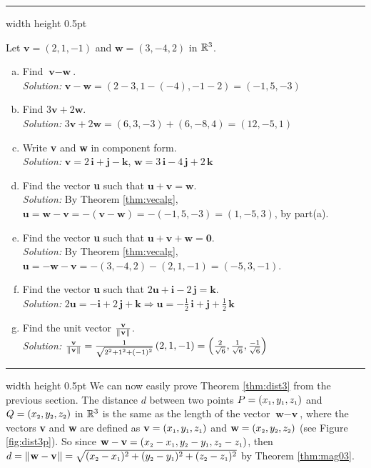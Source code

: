 \hrule width \textwidth height 0.5pt
\begin{exmp}
 Let $\textbf{v} = (2,1,-1)$ and $\textbf{w} = (3,-4,2)$ in $\mathbb{R}^{3}$.
 \begin{enumerate}[(a)]
  \item Find $\textbf{v} - \textbf{w}$.\\\emph{Solution:} $\textbf{v} - \textbf{w} =
   (2 - 3,1 - (-4), -1 - 2) = (-1,5,-3)$
  \item Find $3\textbf{v} + 2\textbf{w}$.\\\emph{Solution:} $3\textbf{v} + 2\textbf{w} = (6,3,-3) + (6,-8,4) =
   (12,-5,1)$
  \item Write \textbf{v} and \textbf{w} in component form.\\\emph{Solution:}
   $\textbf{v} = 2\,\textbf{i} + \textbf{j} - \textbf{k}$, $\textbf{w} = 3\,\textbf{i} - 4\,\textbf{j} + 2\,\textbf{k}$
  \item Find the vector \textbf{u} such that $\textbf{u} + \textbf{v} = \textbf{w}$.\\\emph{Solution:} By Theorem
   \ref{thm:vecalg}, $\textbf{u} = \textbf{w} - \textbf{v} = -(\textbf{v} - \textbf{w}) = -(-1,5,-3) = (1,-5,3)$, by
   part(a).
  \item Find the vector \textbf{u} such that $\textbf{u} + \textbf{v} + \textbf{w} = \textbf{0}$.\\\emph{Solution:}
   By Theorem \ref{thm:vecalg}, $\textbf{u} = -\textbf{w} - \textbf{v} = -(3,-4,2) - (2,1,-1) = (-5,3,-1)$.
  \item Find the vector \textbf{u} such that $2\textbf{u} + \textbf{i} - 2\,\textbf{j} = \textbf{k}$.\\\emph{Solution:}
   $2\textbf{u} = -\textbf{i} + 2\,\textbf{j} + \textbf{k} \Longrightarrow \textbf{u} = -\frac{1}{2}\,\textbf{i} +
  \textbf{j} + \frac{1}{2}\,\textbf{k}$
  \item Find the unit vector $\frac{\textbf{v}}{\lVert\mspace{1mu}\textbf{v}\mspace{1mu}\rVert}$.\\\emph{Solution:}
   $\frac{\textbf{v}}{\lVert\mspace{1mu}\textbf{v}\mspace{1mu}\rVert} = \frac{1}{\sqrt{2^2 + 1^2 + (-1)^2}} \,(2,1,-1) =
   \left ( \frac{2}{\sqrt{6}},\frac{1}{\sqrt{6}},\frac{-1}{\sqrt{6}} \right )$
 \end{enumerate} 
\end{exmp}
\hrule width \textwidth height 0.5pt
\newpage
We can now easily prove Theorem \ref{thm:dist3} from the previous section. The distance $d$ between two
points $P = (x_{\scriptscriptstyle 1},y_{\scriptscriptstyle 1},z_{\scriptscriptstyle 1})$ and $Q = (x_{\scriptscriptstyle 2},y_{\scriptscriptstyle 2},z_{\scriptscriptstyle 2})$ in $\mathbb{R}^{3}$ is the
same as the length of the vector $\textbf{w} - \textbf{v}$, where the vectors \textbf{v} and \textbf{w} are
defined as $\textbf{v} = (x_{\scriptscriptstyle 1},y_{\scriptscriptstyle 1},z_{\scriptscriptstyle 1})$
and $\textbf{w} = (x_{\scriptscriptstyle 2},y_{\scriptscriptstyle 2},z_{\scriptscriptstyle 2})$ (see Figure \ref{fig:dist3p}). So since $\textbf{w} -
\textbf{v} = (x_{\scriptscriptstyle 2} - x_{\scriptscriptstyle 1},y_{\scriptscriptstyle 2} - y_{\scriptscriptstyle 1},z_{\scriptscriptstyle 2} - z_{\scriptscriptstyle 1})$, then
$d = \lVert\mspace{1mu}\textbf{w} - \textbf{v}\mspace{1mu}\rVert = \sqrt{(x_{\scriptscriptstyle 2} - x_{\scriptscriptstyle 1})^2 + (y_{\scriptscriptstyle 2} - y_{\scriptscriptstyle 1})^2 +
(z_{\scriptscriptstyle 2} - z_{\scriptscriptstyle 1})^2}$ by Theorem \ref{thm:mag03}.

